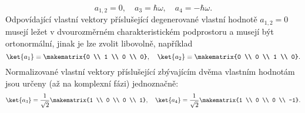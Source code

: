 \begin{solution}
\begin{enumerate}
		\begin{equation}
            a_{1,2}
                =0,\quad 
            a_{3}
                =\hbar\omega,\quad
            a_{4}
                =-\hbar\omega.
		\end{equation}
		Odpovídající vlastní vektory příslušející degenerované vlastní hodnotě $a_{1,2}=0$ musejí ležet v dvourozměrném charakteristickém podprostoru a musejí být ortonormální, jinak je lze zvolit libovolně, například		
		\begin{equation}
            \ket{a_{1}}
                =\makematrix{0 \\ 1 \\ 0 \\ 0},\quad
            \ket{a_{2}}
                =\makematrix{0 \\ 0 \\ 1 \\ 0}.
		\end{equation}
		Normalizované vlastní vektory příslušející zbývajícím dvěma vlastním hodnotám jsou určeny (až na komplexní fázi) jednoznačně:
		\begin{equation}
            \ket{a_{3}}
                =\frac{1}{\sqrt{2}}\makematrix{1 \\ 0 \\ 0 \\ 1},\quad
            \ket{a_{4}}
                =\frac{1}{\sqrt{2}}\makematrix{1 \\ 0 \\ 0 \\ -1}.
        \end{equation}		
        

\end{enumerate}
\end{solution}
